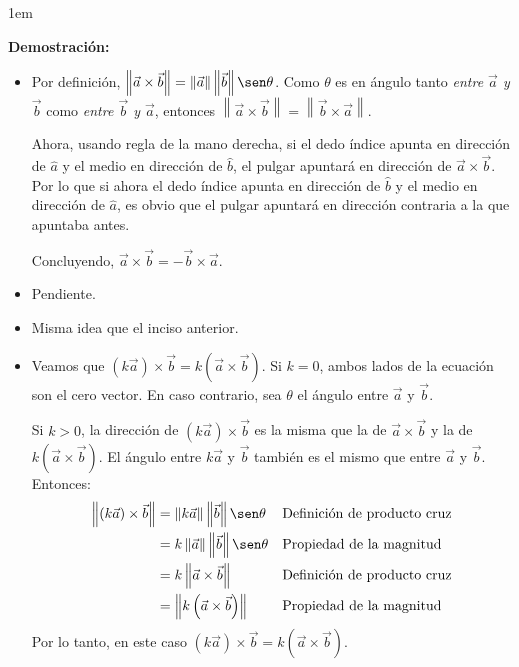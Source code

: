 \documentclass[12pt, fleqn]{report}                             %
\newenvironment{SmallIndentation}[1][0.75em]                    %
    {\begin{adjustwidth}{#1}{}\begin{footnotesize}}                 %
    {\end{footnotesize}\end{adjustwidth}}                           %
\newcommand{\Abs}[1]{\left\lVert #1 \right\lVert}               %
\newcommand{\Wrap}[1]{\left( #1 \right)}                        %
\begin{document}
            	\begin{SmallIndentation}[1em]
            		\textbf{Demostración:}
            		\begin{itemize}\setlength\itemsep{0em}
            			\item Por definición, $\Abs{\vec{a} \times \vec{b}} = \Abs{\vec{a}} \Abs{\vec{b}} \sen \theta$. Como $\theta$ es en ángulo tanto \emph{entre $\vec{a}$ y $\vec{b}$} como \emph{entre $\vec{b}$ y $\vec{a}$}, entonces $\Abs{\vec{a} \times \vec{b}} = \Abs{\vec{b} \times \vec{a}}$.
            			
            			Ahora, usando regla de la mano derecha, si el dedo índice apunta en dirección de $\hat{a}$ y el medio en dirección de $\hat{b}$, el pulgar apuntará en dirección de $\vec{a} \times \vec{b}$. Por lo que si ahora el dedo índice apunta en dirección de $\hat{b}$ y el medio en dirección de $\hat{a}$, es obvio que el pulgar apuntará en dirección contraria a la que apuntaba antes.
            			
            			Concluyendo, $\vec{a} \times \vec{b} = -\vec{b} \times \vec{a}$.
            			
            			\item Pendiente.
            			
            			\item Misma idea que el inciso anterior.
            			
            			\item Veamos que $\Wrap{k \vec{a}} \times \vec{b} = k\Wrap{\vec{a} \times \vec{b}}$. Si $k=0$, ambos lados de la ecuación son el cero vector. En caso contrario, sea $\theta$ el ángulo entre $\vec{a}$ y $\vec{b}$.
            			
            			Si $k>0$, la dirección de $\Wrap{k \vec{a}} \times \vec{b}$ es la misma que la de $\vec{a} \times \vec{b}$ y la de $k\Wrap{\vec{a} \times \vec{b}}$. El ángulo entre $k\vec{a}$ y $\vec{b}$ también es el mismo que entre $\vec{a}$ y $\vec{b}$. Entonces:
            			\begin{align*}
	            			\Abs{(k\vec{a}) \times \vec{b}} &= \Abs{k\vec{a}} \Abs{\vec{b}} \sen \theta &&\mbox{Definición de producto cruz}\\
	            			&= k \Abs{\vec{a}} \Abs{\vec{b}} \sen \theta &&\mbox{Propiedad de la magnitud}\\
	            			&= k \Abs{\vec{a} \times \vec{b}} &&\mbox{Definición de producto cruz}\\
	            			&= \Abs{k\Wrap{\vec{a} \times \vec{b}}} && \mbox{Propiedad de la magnitud}
            			\end{align*}
            			Por lo tanto, en este caso $\Wrap{k\vec{a}} \times \vec{b} = k\Wrap{\vec{a} \times \vec{b}}$.
            			

\end{itemize}
\end{SmallIndentation}
\end{document}
